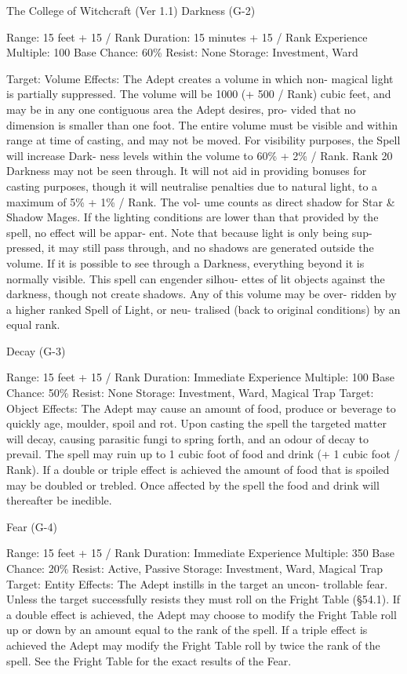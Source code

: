 \begin{Chapter}{The College of Witchcraft (Ver 1.1)}
Darkness (G-2) 

Range: 15 feet + 15 / Rank 
Duration: 15 minutes + 15 / Rank 
Experience Multiple: 100 
Base Chance: 60\% 
Resist: None 
Storage: Investment, Ward 

Target: Volume 
Effects: The Adept creates a volume in which non-
magical  light  is  partially  suppressed.  The  volume 
will be 1000 (+ 500 / Rank) cubic feet, and may be 
in any one contiguous area the Adept desires, pro-
vided  that  no  dimension  is  smaller  than  one  foot. 
The entire volume must be visible and within range 
at  time  of  casting,  and  may  not  be  moved.  For 
visibility  purposes,  the  Spell  will  increase  Dark-
ness levels within the volume to 60\% + 2\% / Rank. 
Rank 20 Darkness may not be seen through. It will 
not  aid  in  providing  bonuses  for  casting  purposes, 
though  it  will  neutralise  penalties  due  to  natural 
light, to a maximum of 5\% + 1\% / Rank. The vol-
ume  counts  as  direct  shadow  for  Star  \&  Shadow 
Mages.  If  the  lighting  conditions  are  lower  than 
that provided by the spell, no effect  will be appar-
ent.  Note  that  because  light  is  only  being  sup-
pressed, it may still pass through, and no shadows 
are generated outside the volume. If it is possible to 
see  through  a  Darkness,  everything  beyond  it  is 
normally  visible.  This  spell  can  engender  silhou-
ettes of lit objects against the darkness, though not 
create  shadows.  Any  of  this  volume  may  be  over-
ridden  by  a  higher  ranked  Spell  of  Light,  or  neu-
tralised  (back  to  original  conditions)  by  an  equal 
rank. 

Decay (G-3) 

Range: 15 feet + 15 / Rank 
Duration: Immediate 
Experience Multiple: 100 
Base Chance: 50\% 
Resist: None 
Storage: Investment, Ward, Magical Trap 
Target: Object 
Effects:  The  Adept  may  cause  an  amount  of  food, 
produce or beverage to quickly age, moulder, spoil 
and  rot.  Upon casting  the  spell  the  targeted  matter 
will  decay,  causing  parasitic  fungi  to  spring  forth, 
and  an  odour  of  decay  to  prevail.  The  spell  may 
ruin up to 1 cubic foot of food and drink (+ 1 cubic 
foot / Rank). If a double or triple effect is achieved 
the amount of food that is spoiled may be doubled 
or trebled. Once affected by the spell the food and 
drink will thereafter be inedible. 

Fear (G-4) 

Range: 15 feet + 15 / Rank 
Duration: Immediate 
Experience Multiple: 350 
Base Chance: 20\% 
Resist: Active, Passive 
Storage: Investment, Ward, Magical Trap 
Target: Entity 
Effects:  The  Adept  instills  in  the  target  an  uncon-
trollable fear. Unless the target successfully resists 
they  must  roll  on  the  Fright  Table  (§54.1).  If  a 
double effect is achieved, the Adept may choose to 
modify  the  Fright  Table  roll  up  or  down  by  an 
amount  equal  to  the  rank  of  the  spell.  If  a  triple 
effect is achieved the Adept may modify the Fright 
Table  roll  by  twice  the  rank  of  the  spell.  See  the 
Fright Table for the exact results of the Fear. 


\end{Chapter}
